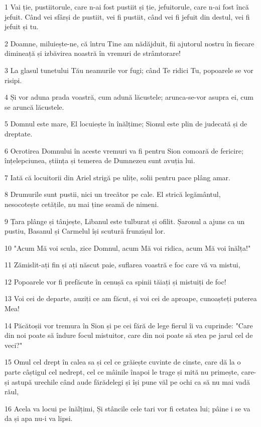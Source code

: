 \par 1 Vai ție, pustiitorule, care n-ai fost pustiit și ție, jefuitorule, care n-ai fost încă jefuit. Când vei sfârși de pustiit, vei fi pustiit, când vei fi jefuit din destul, vei fi jefuit și tu.
\par 2 Doamne, miluiește-ne, că întru Tine am nădăjduit, fii ajutorul nostru în fiecare dimineață și izbăvirea noastră în vremuri de strâmtorare!
\par 3 La glasul tunetului Tău neamurile vor fugi; când Te ridici Tu, popoarele se vor risipi.
\par 4 Și vor aduna prada voastră, cum adună lăcustele; arunca-se-vor asupra ei, cum se aruncă lăcustele.
\par 5 Domnul este mare, El locuiește în înălțime; Sionul este plin de judecată și de dreptate.
\par 6 Ocrotirea Domnului în aceste vremuri va fi pentru Sion comoară de fericire; înțelepciunea, știința și temerea de Dumnezeu sunt avuția lui.
\par 7 Iată că locuitorii din Ariel strigă pe ulițe, solii pentru pace plâng amar.
\par 8 Drumurile sunt pustii, nici un trecător pe cale. El strică legământul, nesocotește cetățile, nu mai ține seamă de nimeni.
\par 9 Țara plânge și tânjește, Libanul este tulburat și ofilit. Șaronul a ajuns ca un pustiu, Basanul și Carmelul își scutură frunzișul lor.
\par 10 "Acum Mă voi scula, zice Domnul, acum Mă voi ridica, acum Mă voi înălța!"
\par 11 Zămislit-ați fin și ați născut paie, suflarea voastră e foc care vă va mistui,
\par 12 Popoarele vor fi prefăcute în cenușă ca spinii tăiați și mistuiți de foc!
\par 13 Voi cei de departe, auziți ce am făcut, și voi cei de aproape, cunoașteți puterea Mea!
\par 14 Păcătoșii vor tremura în Sion și pe cei fără de lege fierul îi va cuprinde: "Care din noi poate să îndure focul mistuitor, care din noi poate să stea pe jarul cel de veci?"
\par 15 Omul cel drept în calea sa și cel ce grăiește cuvinte de cinste, care dă la o parte câștigul cel nedrept, cel ce mâinile înapoi le trage și mită nu primește, care-și astupă urechile când aude fărădelegi și își pune văl pe ochi ca să nu mai vadă răul,
\par 16 Acela va locui pe înălțimi, Și stâncile cele tari vor fi cetatea lui; pâine i se va da și apa nu-i va lipsi.
